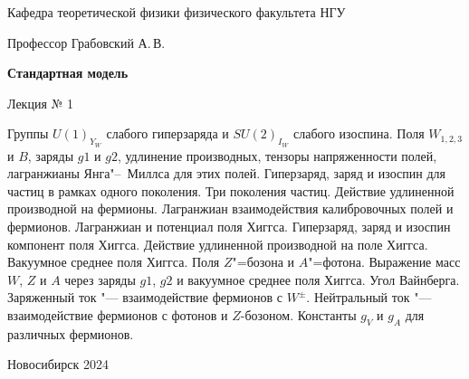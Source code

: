 \documentclass[12pt,pagesize,paper=192mm:108mm,landscape]{scrbook}
\begin{document}
\begin{titlepage}
\begin{center}
    Кафедра теоретической физики физического факультета НГУ

    \Large
    Профессор Грабовский А.\,В.

    \huge
    \textbf{Стандартная модель}

    \Large
    Лекция № 1
    \vfill

    \small
    \begin{minipage}{0.9\linewidth}
      Группы $U(1)_{Y_W}$ слабого гиперзаряда и $SU(2)_{I_W}$ слабого
      изоспина. Поля $W_{1,2,3}$ и $B$, заряды $g1$ и $g2$, удлинение
      производных, тензоры напряженности полей, лагранжианы
      Янга"--~Миллса для этих полей. Гиперзаряд, заряд и изоспин для
      частиц в рамках одного поколения. Три поколения частиц. Действие
      удлиненной производной на фермионы. Лагранжиан взаимодействия
      калибровочных полей и фермионов. Лагранжиан и потенциал поля
      Хиггса. Гиперзаряд, заряд и изоспин компонент поля
      Хиггса. Действие удлиненной производной на поле
      Хиггса. Вакуумное среднее поля Хиггса. Поля $Z$"=бозона и
      $A$"=фотона. Выражение масс $W$, $Z$ и $A$ через заряды $g1$, $g2$ и
      вакуумное среднее поля Хиггса. Угол Вайнберга. Заряженный ток "---
      взаимодействие фермионов с $W^{\pm}$. Нейтральный ток "--- взаимодействие
      фермионов с фотонов и $Z$-бозоном. Константы $g_V$ и $g_A$ для различных
      фермионов.
    \end{minipage}
    \vfill

    \normalsize \ccbysa\hspace{0.5em}  Новосибирск 2024
  \end{center}
\end{titlepage}
\end{document}
